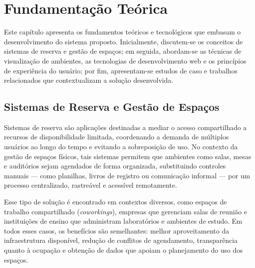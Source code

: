 \chapter{Fundamentação Teórica}\label{chp:FUNDAMENTACAO}

Este capítulo apresenta os fundamentos teóricos e tecnológicos que embasam o desenvolvimento do sistema proposto. Inicialmente, discutem-se os conceitos de sistemas de reserva e gestão de espaços; em seguida, abordam-se as técnicas de visualização de ambientes, as tecnologias de desenvolvimento web e os princípios de experiência do usuário; por fim, apresentam-se estudos de caso e trabalhos relacionados que contextualizam a solução desenvolvida.




\section{Sistemas de Reserva e Gestão de Espaços}\label{sec:sistemasDeReservaEGestaoDeEspacos}


Sistemas de reserva são aplicações destinadas a mediar o acesso compartilhado a recursos de disponibilidade limitada, coordenando a demanda de múltiplos usuários ao longo do tempo e evitando a sobreposição de uso. %
No contexto da gestão de espaços físicos, tais sistemas permitem que ambientes como salas, mesas e auditórios sejam agendados de forma organizada, substituindo controles manuais — como planilhas, livros de registro ou comunicação informal — por um processo centralizado, rastreável e acessível remotamente.

Esse tipo de solução é encontrado em contextos diversos, como espaços de trabalho compartilhado (\textit{coworkings}), empresas que gerenciam salas de reunião e instituições de ensino que administram laboratórios e ambientes de estudo. Em todos esses casos, os benefícios são semelhantes: melhor aproveitamento da infraestrutura disponível, redução de conflitos de agendamento, transparência quanto à ocupação e obtenção de dados que apoiam o planejamento do uso dos espaços. %

